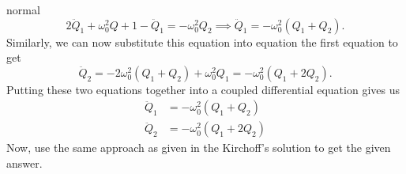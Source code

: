 \begin{solution}{normal}
\[2\ddot{Q}_1 + \omega_0^2 Q+1 - \ddot{Q}_1 = - \omega_0^2 Q_2\implies \ddot{Q}_1 = -\omega_0^2 (Q_1 + Q_2).\]
Similarly, we can now substitute this equation into equation the first equation to get 
\[\ddot{Q}_2 = -2\omega_0^2 (Q_1 + Q_2) + \omega_0^2 Q_1 = -\omega_0^2 (Q_1 + 2Q_2).\]
Putting these two equations together into a coupled differential equation gives us 
\begin{align*}
\ddot{Q}_1 &= -\omega_0^2 (Q_1 + Q_2) \\
\ddot{Q}_2 &= -\omega_0^2 (Q_1 + 2Q_2)
\end{align*}
Now, use the same approach as given in the Kirchoff's solution to get the given answer. 
\end{solution}